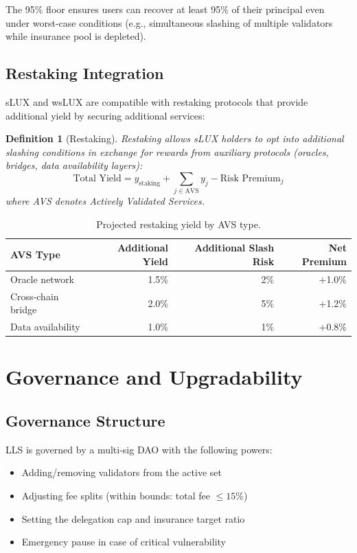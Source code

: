 \documentclass[11pt,a4paper]{article}
\newtheorem{definition}{Definition}
\begin{document}
The 95\% floor ensures users can recover at least 95\% of their principal even under worst-case conditions (e.g., simultaneous slashing of multiple validators while insurance pool is depleted).

\subsection{Restaking Integration}

sLUX and wsLUX are compatible with restaking protocols that provide additional yield by securing additional services:

\begin{definition}[Restaking]
Restaking allows sLUX holders to opt into additional slashing conditions in exchange for rewards from auxiliary protocols (oracles, bridges, data availability layers):
\begin{equation}
    \text{Total Yield} = y_{\text{staking}} + \sum_{j \in \text{AVS}} y_j - \text{Risk Premium}_j
\end{equation}
where AVS denotes Actively Validated Services.
\end{definition}

\begin{table}[H]
\centering
\caption{Projected restaking yield by AVS type.}
\label{tab:restaking}
\begin{tabular}{lrrr}
\toprule
\textbf{AVS Type} & \textbf{Additional Yield} & \textbf{Additional Slash Risk} & \textbf{Net Premium} \\
\midrule
Oracle network & 1.5\% & 2\% & +1.0\% \\
Cross-chain bridge & 2.0\% & 5\% & +1.2\% \\
Data availability & 1.0\% & 1\% & +0.8\% \\
\bottomrule
\end{tabular}
\end{table}

\section{Governance and Upgradability}\label{sec:governance}

\subsection{Governance Structure}

LLS is governed by a multi-sig DAO with the following powers:
\begin{itemize}
    \item Adding/removing validators from the active set
    \item Adjusting fee splits (within bounds: total fee $\leq 15\%$)
    \item Setting the delegation cap and insurance target ratio
    \item Emergency pause in case of critical vulnerability
\end{itemize}
\end{document}
